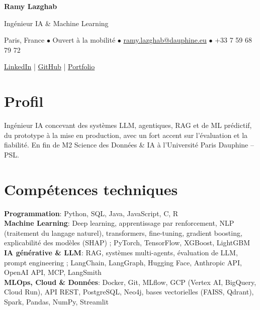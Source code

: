 \documentclass[9.5pt,a4paper]{article}
\newcommand{\cvitem}[2]{\textbf{#1}: #2\\[2pt]}
\begin{document}
\begin{center}
{\Huge\bfseries Ramy Lazghab}

\vspace{1.2mm}
{\large Ing\'enieur IA \& Machine Learning}

\vspace{1.2mm}
Paris, France $\bullet$ Ouvert \`a la mobilit\'e
\hspace{0.3cm}$\bullet$\hspace{0.3cm}
\href{mailto:ramy.lazghab@dauphine.eu}{ramy.lazghab@dauphine.eu}
\hspace{0.3cm}$\bullet$\hspace{0.3cm}
+33 7 59 68 79 72

\vspace{1.2mm}
\href{https://linkedin.com/in/ramy-lazghab-1464a8201}{LinkedIn}
\hspace{0.3cm}|\hspace{0.3cm}
\href{https://github.com/Rblaze23}{GitHub}
\hspace{0.3cm}|\hspace{0.3cm}
\href{https://rblaze23.github.io/RamyLazghab/}{Portfolio}

\end{center}

\section*{Profil}
Ing\'enieur IA concevant des syst\`emes LLM, agentiques, RAG et de ML pr\'edictif, du prototype \`a la mise en production, avec un fort accent sur l'\'evaluation et la fiabilit\'e. En fin de M2 Science des Donn\'ees \& IA \`a l'Universit\'e Paris Dauphine -- PSL.

\section*{Comp\'etences techniques}
\cvitem{Programmation}{Python, SQL, Java, JavaScript, C, R}
\cvitem{Machine Learning}{Deep learning, apprentissage par renforcement, NLP (traitement du langage naturel), transformers, fine-tuning, gradient boosting, explicabilit\'e des mod\`eles (SHAP) ; PyTorch, TensorFlow, XGBoost, LightGBM}
\cvitem{IA g\'en\'erative \& LLM}{RAG, syst\`emes multi-agents, \'evaluation de LLM, prompt engineering ; LangChain, LangGraph, Hugging Face, Anthropic API, OpenAI API, MCP, LangSmith}
\cvitem{MLOps, Cloud \& Donn\'ees}{Docker, Git, MLflow, GCP (Vertex AI, BigQuery, Cloud Run), API REST, PostgreSQL, Neo4j, bases vectorielles (FAISS, Qdrant), Spark, Pandas, NumPy, Streamlit}
\end{document}
